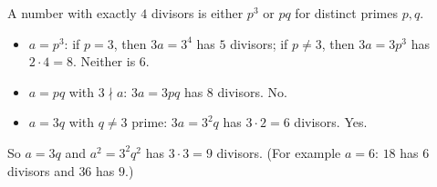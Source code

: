 A number with exactly $4$ divisors is either $p^3$ or $pq$ for distinct primes $p,q$.
\begin{itemize}
\item $a=p^3$: if $p=3$, then $3a=3^4$ has $5$ divisors; if $p\ne3$, then $3a=3p^3$ has $2\cdot4=8$. Neither is $6$.
\item $a=pq$ with $3\nmid a$: $3a=3pq$ has $8$ divisors. No.
\item $a=3q$ with $q\ne3$ prime: $3a=3^2q$ has $3\cdot2=6$ divisors. Yes.
\end{itemize}
So $a=3q$ and $a^2=3^2q^2$ has $3\cdot3=\boxed{9}$ divisors. (For example $a=6$: $18$ has $6$ divisors and $36$ has $9$.)
